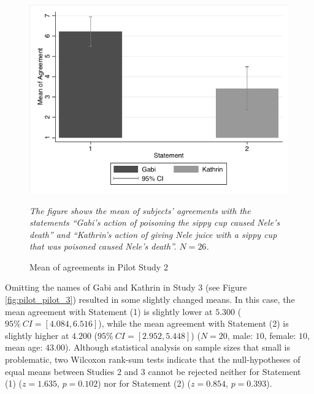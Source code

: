 \documentclass[egregdoesnotlikesansseriftitles,12pt]{scrartcl}
\begin{document}
\begin{figure}[H]
   \centering
   \includegraphics[scale=0.8]{figures/pilot_study_2.pdf}
   \begin{minipage}{0.9\linewidth}
   \footnotesize
   \emph{The figure shows the mean of subjects' agreements with the statements ``Gabi's action of poisoning the sippy cup caused Nele's death'' and ``Kathrin's action of giving Nele juice with a sippy cup that was poisoned caused Nele's death''. $N=26$.}
   \end{minipage}
   \caption{Mean of agreements in Pilot Study 2}
   \label{fig:pilot_study_2}
\end{figure}

\noindent Omitting the names of Gabi and Kathrin in Study 3 (see Figure \ref{fig:pilot_pilot_3}) resulted in some slightly changed means. In this case, the mean agreement with Statement (1) is slightly lower at $5.300$ ($95\%~CI=[4.084,6.516]$), while the mean agreement with Statement (2) is slightly higher at $4.200$ ($95\%~CI=[2.952,5.448]$) ($N=20$, male: $10$, female: $10$, mean age: $43.00$). Although statistical analysis on sample sizes that small is problematic, two Wilcoxon rank-sum tests indicate that the null-hypotheses of equal means between Studies 2 and 3 cannot be rejected neither for Statement (1) ($z=1.635$, $p=0.102$) nor for Statement (2) ($z=0.854$, $p=0.393$).
\end{document}
